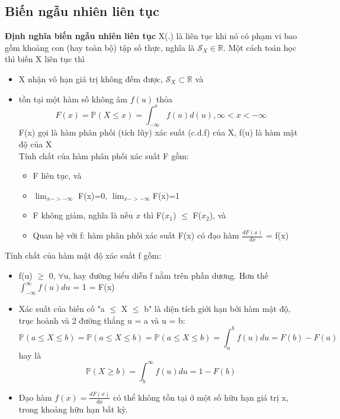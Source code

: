 \documentclass[a4paper, 13pt]{report}
\begin{document}
\subsection*{Biến ngẫu nhiên liên tục}   
\textbf{Định nghĩa biến ngẫu nhiên liên tục} X(.) là liên tục khi nó có phạm vi bao gồm khoảng con (hay toàn bộ) tập số thực, nghĩa là $\mathcal{S}_X \in \mathbb{R}$. Một cách toán học thì biến X liên tục thì 
\begin{itemize}
\item X nhận vô hạn giá trị không đếm được, $\mathcal{S}_X \subset \mathbb{R}$ và 
\item tồn tại một hàm số không âm $f(u)$ thỏa
\[
F(x) = \mathbb{P}(X \leq x) = \int_{-\infty}^{x} f(u)d(u), \infty < x < -\infty 
\]
F(x) gọi là hàm phân phối (tích lũy) xác suất (c.d.f) của X, f(u) là hàm mật độ của X\\
Tính chất của hàm phân phối xác suất F gồm:
\begin{itemize}
\item F liên tục, và
\item $\lim_{x->-\infty}$ F(x)=0, $\lim_{x->-\infty}$F(x)=1
\item F không giảm, nghĩa là nếu $x$ thì F($x_1$) $\leq$ F($x_2$), và
\item Quan hệ với f: hàm phân phối xác suất F(x) có đạo hàm $\frac{dF(x)}{dx}$ = f(x)     
\end{itemize}
\end{itemize}
Tính chất của hàm mật độ xác suất f gồm:
\begin{itemize}
\item f(u) $\geq$ 0, $\forall$u, hay đường biểu diễn f nằm trên phần dương. Hơn thế $\int_{-\infty}^{\infty} f(u)du$ = 1 = F(x)
\item Xác suất của biến cố "a $\leq$ X $\leq$ b" là diện tích giới hạn bởi hàm mật độ, trục hoành và 2 đường thẳng u = a và u = b:
\[
\mathbb{P}(a \leq X \leq b) = \mathbb{P}(a \le X \le b) = \mathbb{P}(a \leq X \le b) = \int_{a}^{b} f(u)du = F(b) - F(a)
\] 
hay là 
\[
\mathbb{P}(X \geq b) = \int_{b}^{\infty} f(u)du = 1 - F(b)
\]
\item Đạo hàm $f(x) = \frac{dF(x)}{dx}$ có thể không tồn tại ở một số hữu hạn giá trị x, trong khoảng hữu hạn bất kỳ.   
\end{itemize}
\end{document}
